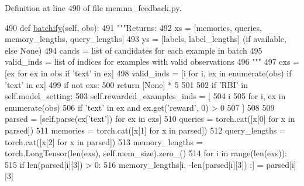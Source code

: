 Definition at line 490 of file memnn\+\_\+feedback.\+py.


\begin{DoxyCode}
490     \textcolor{keyword}{def }\hyperlink{namespaceparlai_1_1agents_1_1drqa_1_1utils_aca22dd97c5b6dcda2a7479c1cb22ef1e}{batchify}(self, obs):
491         \textcolor{stringliteral}{"""Returns:}
492 \textcolor{stringliteral}{            xs = [memories, queries, memory\_lengths, query\_lengths]}
493 \textcolor{stringliteral}{            ys = [labels, label\_lengths] (if available, else None)}
494 \textcolor{stringliteral}{            cands = list of candidates for each example in batch}
495 \textcolor{stringliteral}{            valid\_inds = list of indices for examples with valid observations}
496 \textcolor{stringliteral}{        """}
497         exs = [ex \textcolor{keywordflow}{for} ex \textcolor{keywordflow}{in} obs \textcolor{keywordflow}{if} \textcolor{stringliteral}{'text'} \textcolor{keywordflow}{in} ex]
498         valid\_inds = [i \textcolor{keywordflow}{for} i, ex \textcolor{keywordflow}{in} enumerate(obs) \textcolor{keywordflow}{if} \textcolor{stringliteral}{'text'} \textcolor{keywordflow}{in} ex]
499         \textcolor{keywordflow}{if} \textcolor{keywordflow}{not} exs:
500             \textcolor{keywordflow}{return} [\textcolor{keywordtype}{None}] * 5
501 
502         \textcolor{keywordflow}{if} \textcolor{stringliteral}{'RBI'} \textcolor{keywordflow}{in} self.model\_setting:
503             self.rewarded\_examples\_inds = [
504                 i
505                 \textcolor{keywordflow}{for} i, ex \textcolor{keywordflow}{in} enumerate(obs)
506                 \textcolor{keywordflow}{if} \textcolor{stringliteral}{'text'} \textcolor{keywordflow}{in} ex \textcolor{keywordflow}{and} ex.get(\textcolor{stringliteral}{'reward'}, 0) > 0
507             ]
508 
509         parsed = [self.parse(ex[\textcolor{stringliteral}{'text'}]) \textcolor{keywordflow}{for} ex \textcolor{keywordflow}{in} exs]
510         queries = torch.cat([x[0] \textcolor{keywordflow}{for} x \textcolor{keywordflow}{in} parsed])
511         memories = torch.cat([x[1] \textcolor{keywordflow}{for} x \textcolor{keywordflow}{in} parsed])
512         query\_lengths = torch.cat([x[2] \textcolor{keywordflow}{for} x \textcolor{keywordflow}{in} parsed])
513         memory\_lengths = torch.LongTensor(len(exs), self.mem\_size).zero\_()
514         \textcolor{keywordflow}{for} i \textcolor{keywordflow}{in} range(len(exs)):
515             \textcolor{keywordflow}{if} len(parsed[i][3]) > 0:
516                 memory\_lengths[i, -len(parsed[i][3]) :] = parsed[i][3]

\end{DoxyCode}
